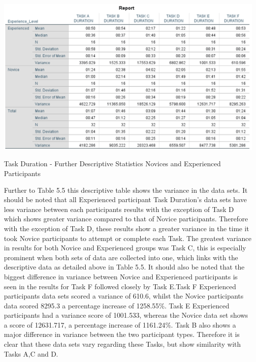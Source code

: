 \begin{table}[H]
\includegraphics[width=\linewidth]{Screenshots/UXResearchDataFiles/UXTaskDurationData/taskDurationOverallEdited.png}
\label{DurationOverallFurtherStats}
\caption{Task Duration - Further Descriptive Statistics Novices and Experienced Participants}
\end{table}

Further to Table 5.5 this descriptive table shows the variance in the data sets. It should be noted that all Experienced participant Task Duration's data sets have less variance between each participants results with the exception of Task D which shows greater variance compared to that of Novice participants. Therefore with the exception of Task D, these results show a greater variance in the time it took Novice participants to attempt or complete each Task. The greatest variance in results for both Novice and Experienced groups was Task C, this is especially prominent when both sets of data are collected into one, which links with the descriptive data as detailed above in Table 5.5. It should also be noted that the biggest difference in variance between Novice and Experienced participants is seen in the results for Task F followed closely by Task E.Task F Experienced participants data sets scored a variance of 610.6, whilst the Novice participants data scored 8295.3 a percentage increase of 1258.55\%. Task E Experienced participants had a variance score of 1001.533, whereas the Novice data set shows a score of 12631.717, a percentage increase of 1161.24\%. Task B also shows a major difference in variance between the two participant types. Therefore it is clear that these data sets vary regarding these Tasks, but show similarity with Tasks A,C and D.


